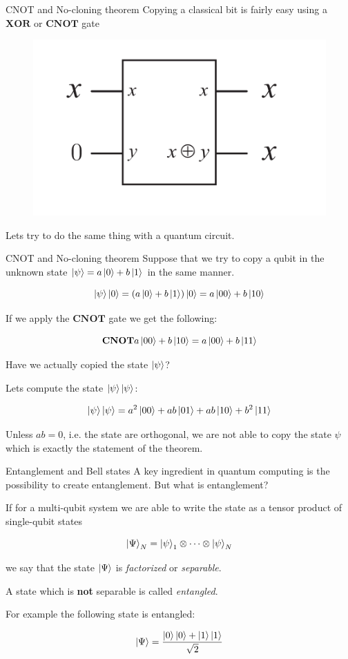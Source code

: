 \documentclass[11p,aspectratio=169]{beamer}
\begin{document}
\begin{frame}{CNOT and No-cloning theorem}
    Copying a classical bit is fairly easy using a $\textbf{XOR}$ or $\textbf{CNOT}$ gate 

    \begin{figure}
        \includegraphics[width=0.5 \textwidth]{figures/copy_classical.png}
    \end{figure}
    Lets try to do the same thing with a quantum circuit.
\end{frame}

\begin{frame}{CNOT and No-cloning theorem}
    Suppose that we try to copy a qubit in the unknown state $\ket{\psi} = a \ket{0} + b \ket{1}$
    in the same manner.

    $$  \ket{\psi} \ket{0} = ( a \ket{0} + b \ket{1} ) \ket{0} = a \ket{00} + b \ket{10}$$

    If we apply the $\textbf{CNOT}$ gate we get the following:

    $$ \textbf{CNOT} a \ket{00} + b \ket{10} = a \ket{00} + b \ket{11}$$ 

    Have we actually copied the state $\ket{\psi}$?

    Lets compute the state $\ket{\psi} \ket{\psi}$:

    $$ \ket{\psi} \ket{\psi} = a^2 \ket{00} + ab \ket{01} + ab \ket{10} + b^2 \ket{11}$$

    Unless $ab = 0$, i.e. the state are orthogonal, we are not able to copy the state $\psi$ which 
    is exactly the statement of the theorem.
\end{frame}


\begin{frame}{Entanglement and Bell states}
    A key ingredient in quantum computing is the possibility to create entanglement. But what is entanglement?

    If for a multi-qubit system we are able to write the state as a tensor product of single-qubit states
    
    $$ \ket{\Psi}_N = \ket{\psi}_1 \otimes \cdots \otimes \ket{\psi}_N $$

    we say that the state $\ket{\Psi}$ is \emph{factorized} or \emph{separable}.

    \begin{tcolorbox}[title=Entagled state]
        A state which is \textbf{not} separable is called \emph{entangled}.
    \end{tcolorbox}
        For example the following state is entangled:

        $$ \ket{\Psi} = \frac{\ket{0}\ket{0} + \ket{1}\ket{1}}{\sqrt{2}}$$
    
\end{frame}
\end{document}
